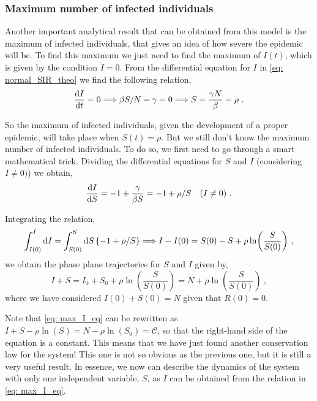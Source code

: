\subsubsection*{Maximum number of infected individuals}

Another important analytical result that can be obtained from this model is
the maximum of infected individuals, that gives an idea of how severe the
epidemic will be. To find this maximum we just need to find the maximum of
$I(t)$, which is given by the condition $\dot{I}=0$. From the differential
equation for $I$ in \cref{eq: normal_SIR_theo} we find the following relation,
\begin{equation}
  \frac{\mathrm{d} I}{\mathrm{d} t}=0\Longrightarrow\beta S/N-\gamma=0\Longrightarrow
  S=\frac{\gamma N}{\beta}=\rho \ .
\end{equation}

So the maximum of infected individuals, given the development of a proper
epidemic, will take place when $S(t)=\rho$. But we still don't know the
maximum number of infected individuals. To do so, we first need to go through
a smart mathematical trick. Dividing the differential equations for $S$ and $I$
(considering $I\neq0)$) we obtain,
\begin{equation*}
  \frac{\mathrm{d} I}{\mathrm{d} S}=-1+\frac{\gamma}{\beta S}=-1+\rho/S \quad (I\neq0) \
  .
\end{equation*}

Integrating the relation,
\begin{equation*}
  \int_{I(0)}^{I}\mathrm{d} I=\int_{S(0)}^S\mathrm{d} S \left\{-1 + \rho/S\right\} \Longrightarrow
  I-I(0)=S(0)-S+\rho\ln(\frac{S}{S(0)}) \ ,
\end{equation*}
we obtain the phase plane trajectories for $S$ and $I$ given by,
\begin{equation}\label{eq: max_I_eq}
  I+S=I_0+S_0+\rho\ln(\frac{S}{S(0)})=N+\rho\ln(\frac{S}{S(0)}) \ ,
\end{equation}
where we have considered $I(0)+S(0)=N$ given that $R(0)=0$.

Note that \cref{eq: max_I_eq} can be rewritten as
$I+S-\rho\ln(S)=N-\rho\ln(S_0)=\mathcal{C}$, so that the right-hand side of the
equation is a constant. This means that we have just found another conservation
law for the system! This one is not so obvious as the previous one, but it is
still a very useful result. In essence, we now can describe the dynamics of the
system with only one independent variable, $S$, as $I$ can be obtained from the
relation in \cref{eq: max_I_eq}.

